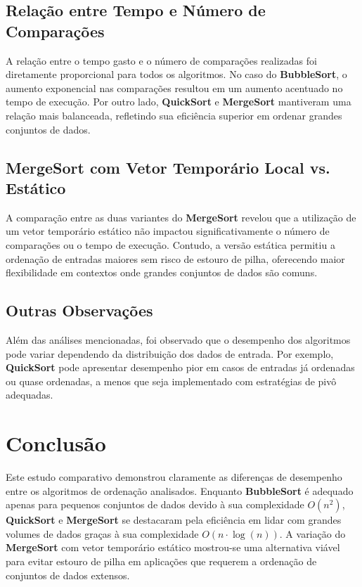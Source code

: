 \documentclass[a4paper,12pt]{article}
\begin{document}
\subsection{Relação entre Tempo e Número de Comparações}

A relação entre o tempo gasto e o número de comparações realizadas foi diretamente proporcional para todos os algoritmos. No caso do \textbf{BubbleSort}, o aumento exponencial nas comparações resultou em um aumento acentuado no tempo de execução. Por outro lado, \textbf{QuickSort} e \textbf{MergeSort} mantiveram uma relação mais balanceada, refletindo sua eficiência superior em ordenar grandes conjuntos de dados.

\subsection{MergeSort com Vetor Temporário Local vs. Estático}

A comparação entre as duas variantes do \textbf{MergeSort} revelou que a utilização de um vetor temporário estático não impactou significativamente o número de comparações ou o tempo de execução. Contudo, a versão estática permitiu a ordenação de entradas maiores sem risco de estouro de pilha, oferecendo maior flexibilidade em contextos onde grandes conjuntos de dados são comuns.

\subsection{Outras Observações}

Além das análises mencionadas, foi observado que o desempenho dos algoritmos pode variar dependendo da distribuição dos dados de entrada. Por exemplo, \textbf{QuickSort} pode apresentar desempenho pior em casos de entradas já ordenadas ou quase ordenadas, a menos que seja implementado com estratégias de pivô adequadas.

\section{Conclusão}

Este estudo comparativo demonstrou claramente as diferenças de desempenho entre os algoritmos de ordenação analisados. Enquanto \textbf{BubbleSort} é adequado apenas para pequenos conjuntos de dados devido à sua complexidade \(O(n^2)\), \textbf{QuickSort} e \textbf{MergeSort} se destacaram pela eficiência em lidar com grandes volumes de dados graças à sua complexidade \(O(n \cdot \log(n))\). A variação do \textbf{MergeSort} com vetor temporário estático mostrou-se uma alternativa viável para evitar estouro de pilha em aplicações que requerem a ordenação de conjuntos de dados extensos.
\end{document}
